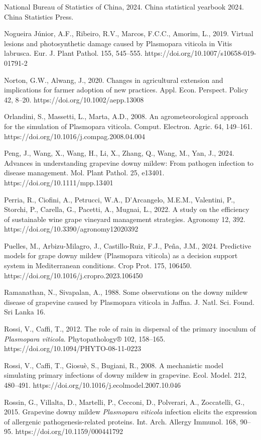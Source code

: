 \documentclass[
]{article}
\begin{document}
National Bureau of Statistics of China, 2024. China statistical yearbook
2024. China Statistics Press.

Nogueira Júnior, A.F., Ribeiro, R.V., Marcos, F.C.C., Amorim, L., 2019.
Virtual lesions and photosynthetic damage caused by Plasmopara viticola
in Vitis labrusca. Eur. J. Plant Pathol. 155, 545--555.
https://doi.org/10.1007/s10658-019-01791-2

Norton, G.W., Alwang, J., 2020. Changes in agricultural extension and
implications for farmer adoption of new practices. Appl. Econ. Perspect.
Policy 42, 8--20. https://doi.org/10.1002/aepp.13008

Orlandini, S., Massetti, L., Marta, A.D., 2008. An agrometeorological
approach for the simulation of Plasmopara viticola. Comput. Electron.
Agric. 64, 149--161. https://doi.org/10.1016/j.compag.2008.04.004

Peng, J., Wang, X., Wang, H., Li, X., Zhang, Q., Wang, M., Yan, J.,
2024. Advances in understanding grapevine downy mildew: From pathogen
infection to disease management. Mol. Plant Pathol. 25, e13401.
https://doi.org/10.1111/mpp.13401

Perria, R., Ciofini, A., Petrucci, W.A., D'Arcangelo, M.E.M., Valentini,
P., Storchi, P., Carella, G., Pacetti, A., Mugnai, L., 2022. A study on
the efficiency of sustainable wine grape vineyard management strategies.
Agronomy 12, 392. https://doi.org/10.3390/agronomy12020392

Puelles, M., Arbizu-Milagro, J., Castillo-Ruiz, F.J., Peña, J.M., 2024.
Predictive models for grape downy mildew (Plasmopara viticola) as a
decision support system in Mediterranean conditions. Crop Prot. 175,
106450. https://doi.org/10.1016/j.cropro.2023.106450

Ramanathan, N., Sivapalan, A., 1988. Some observations on the downy
mildew disease of grapevine caused by Plasmopara viticola in Jaffna. J.
Natl. Sci. Found. Sri Lanka 16.

Rossi, V., Caffi, T., 2012. The role of rain in dispersal of the primary
inoculum of \emph{Plasmopara viticola}. Phytopathology® 102, 158--165.
https://doi.org/10.1094/PHYTO-08-11-0223

Rossi, V., Caffi, T., Giosuè, S., Bugiani, R., 2008. A mechanistic model
simulating primary infections of downy mildew in grapevine. Ecol. Model.
212, 480--491. https://doi.org/10.1016/j.ecolmodel.2007.10.046

Rossin, G., Villalta, D., Martelli, P., Cecconi, D., Polverari, A.,
Zoccatelli, G., 2015. Grapevine downy mildew \emph{Plasmopara
viticola} infection elicits the expression of allergenic
pathogenesis-related proteins. Int. Arch. Allergy Immunol. 168, 90--95.
https://doi.org/10.1159/000441792
\end{document}
